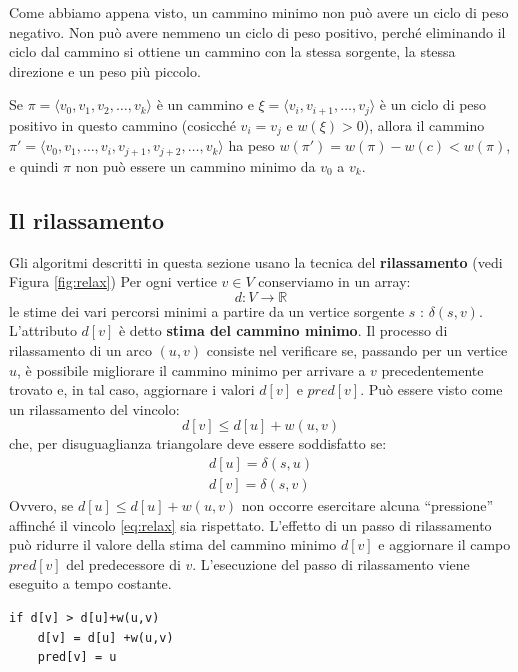 \begin{example}
	Come abbiamo appena visto, un cammino minimo non può avere un ciclo di peso negativo. Non può avere nemmeno un ciclo di peso positivo, perché eliminando il ciclo dal cammino si ottiene un cammino con la stessa sorgente, la stessa direzione e un peso più piccolo.
	\medskip

	Se $\pi=\langle v_{0},v_{1},v_{2},\ldots,v_{k}\rangle$ è un cammino e $\xi = \langle v_{i}, v_{i+1}, \ldots, v_{j} \rangle $ è un ciclo di peso positivo in questo cammino (cosicché $v_{i}=v_{j}$ e $w(\xi)>0$), allora il cammino $\pi' = \langle v_{0},v_{1},\ldots,v_{i},v_{j+1},v_{j+2},\ldots,v_{k} \rangle$ ha peso $w(\pi')=w(\pi)-w(c)<w(\pi)$, e quindi $\pi$ non può essere un cammino minimo da $v_{0}$ a $v_{k}$.
\end{example}

\subsection{Il rilassamento}
Gli algoritmi descritti in questa sezione usano la tecnica del \textbf{rilassamento} (vedi Figura \ref{fig:relax}) Per ogni vertice $v \in V$ conserviamo in un array:
\begin{equation}
	d : V \longrightarrow \mathbb{R}
\end{equation}
le stime dei vari percorsi minimi a partire da un vertice sorgente $s$ : $\delta(s,v)$. L'attributo $d[v]$ è detto \textbf{stima del cammino minimo}. Il processo di rilassamento di un arco $(u,v)$ consiste nel verificare se, passando per un vertice $u$, è possibile migliorare il cammino minimo per arrivare a $v$ precedentemente trovato e, in tal caso, aggiornare i valori $d[v]$ e $pred[v]$. Può essere visto come un rilassamento del vincolo:
\begin{equation}\label{eq:relax}
	d[v] \leq d[u] + w(u,v)
\end{equation}
che, per disuguaglianza triangolare deve essere soddisfatto se:
\begin{displaymath}
	\begin{array}{l}
		d[u] = \delta(s,u)\\
		d[v] = \delta(s,v)
	\end{array}
\end{displaymath}
Ovvero, se $d[u] \leq d[u] + w(u,v)$ non occorre esercitare alcuna ``pressione'' affinché il vincolo \ref{eq:relax} sia rispettato. L'effetto di un passo di rilassamento può ridurre il valore della stima del cammino minimo $d[v]$ e aggiornare il campo $pred[v]$ del predecessore di $v$. L'esecuzione del passo di rilassamento viene eseguito a tempo costante.
\begin{lstlisting}[caption={\textsc{Relax}(u,v,w)},language=asd]
if d[v] > d[u]+w(u,v)
	d[v] = d[u] +w(u,v)
	pred[v] = u
\end{lstlisting}

